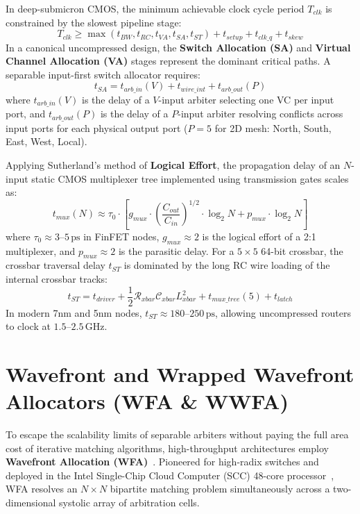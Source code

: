 In deep-submicron CMOS, the minimum achievable clock cycle period $T_{clk}$ is constrained by the slowest pipeline stage:
\begin{equation}
T_{clk} \ge \max(t_{BW}, t_{RC}, t_{VA}, t_{SA}, t_{ST}) + t_{setup} + t_{clk\_q} + t_{skew}
\label{eq:ch3_clk_period}
\end{equation}
In a canonical uncompressed design, the \textbf{Switch Allocation (SA)} and \textbf{Virtual Channel Allocation (VA)} stages represent the dominant critical paths. A separable input-first switch allocator requires:
\begin{equation}
t_{SA} = t_{arb\_in}(V) + t_{wire\_int} + t_{arb\_out}(P)
\label{eq:ch3_t_sa}
\end{equation}
where $t_{arb\_in}(V)$ is the delay of a $V$-input arbiter selecting one VC per input port, and $t_{arb\_out}(P)$ is the delay of a $P$-input arbiter resolving conflicts across input ports for each physical output port ($P = 5$ for 2D mesh: North, South, East, West, Local).

Applying Sutherland's method of \textbf{Logical Effort}, the propagation delay of an $N$-input static CMOS multiplexer tree implemented using transmission gates scales as:
\begin{equation}
t_{mux}(N) \approx \tau_0 \cdot \left[ g_{mux} \cdot \left(\frac{C_{out}}{C_{in}}\right)^{1/2} \cdot \log_2 N + p_{mux} \cdot \log_2 N \right]
\label{eq:ch3_logical_effort}
\end{equation}
where $\tau_0 \approx 3\text{--}5\,\mathrm{ps}$ in FinFET nodes, $g_{mux} \approx 2$ is the logical effort of a 2:1 multiplexer, and $p_{mux} \approx 2$ is the parasitic delay. For a $5 \times 5$ 64-bit crossbar, the crossbar traversal delay $t_{ST}$ is dominated by the long RC wire loading of the internal crossbar tracks:
\begin{equation}
t_{ST} = t_{driver} + \frac{1}{2} \mathcal{R}_{xbar} \mathcal{C}_{xbar} L_{xbar}^2 + t_{mux\_tree}(5) + t_{latch}
\label{eq:ch3_t_st}
\end{equation}
In modern 7nm and 5nm nodes, $t_{ST} \approx 180\text{--}250\,\mathrm{ps}$, allowing uncompressed routers to clock at $1.5\text{--}2.5\,\mathrm{GHz}$.

\section{Wavefront and Wrapped Wavefront Allocators (WFA \& WWFA)}
\label{sec:ch3_wavefront}

To escape the scalability limits of separable arbiters without paying the full area cost of iterative matching algorithms, high-throughput architectures employ \textbf{Wavefront Allocation (WFA)}~\cite{Tamir1993}. Pioneered for high-radix switches and deployed in the Intel Single-Chip Cloud Computer (SCC) 48-core processor~\cite{Howard2011}, WFA resolves an $N \times N$ bipartite matching problem simultaneously across a two-dimensional systolic array of arbitration cells.

